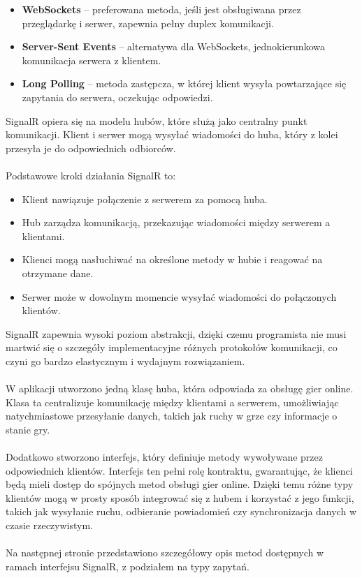 \documentclass[12pt,a4paper]{article}
\begin{document}
\begin{itemize}
    \item \textbf{WebSockets} – preferowana metoda, jeśli jest obsługiwana przez przeglądarkę i serwer, zapewnia pełny duplex komunikacji.
    \item \textbf{Server-Sent Events} – alternatywa dla WebSockets, jednokierunkowa komunikacja serwera z klientem.
    \item \textbf{Long Polling} – metoda zastępcza, w której klient wysyła powtarzające się zapytania do serwera, oczekując odpowiedzi.
\end{itemize}

\noindent
SignalR opiera się na modelu hubów, które służą jako centralny punkt komunikacji. Klient i serwer mogą wysyłać wiadomości do huba, który z kolei przesyła je do odpowiednich odbiorców. 
\\\\
Podstawowe kroki działania SignalR to:

\begin{itemize}
    \item Klient nawiązuje połączenie z serwerem za pomocą huba.
    \item Hub zarządza komunikacją, przekazując wiadomości między serwerem a klientami.
    \item Klienci mogą nasłuchiwać na określone metody w hubie i reagować na otrzymane dane.
    \item Serwer może w dowolnym momencie wysyłać wiadomości do połączonych klientów.
\end{itemize}

\noindent
SignalR zapewnia wysoki poziom abstrakcji, dzięki czemu programista nie musi martwić się o szczegóły implementacyjne różnych protokołów komunikacji, co czyni go bardzo elastycznym i wydajnym rozwiązaniem.
\\\\
W aplikacji utworzono jedną klasę huba, która odpowiada za obsługę gier online. Klasa ta centralizuje komunikację między klientami a serwerem, umożliwiając natychmiastowe przesyłanie danych, takich jak ruchy w grze czy informacje o stanie gry.
\\\\
Dodatkowo stworzono interfejs, który definiuje metody wywoływane przez odpowiednich klientów. Interfejs ten pełni rolę kontraktu, gwarantując, że klienci będą mieli dostęp do spójnych metod obsługi gier online. Dzięki temu różne typy klientów mogą w prosty sposób integrować się z hubem i korzystać z jego funkcji, takich jak wysyłanie ruchu, odbieranie powiadomień czy synchronizacja danych w czasie rzeczywistym.
\\\\
Na następnej stronie przedstawiono szczegółowy opis metod dostępnych w ramach interfejsu SignalR, z podziałem na typy zapytań.
\end{document}
